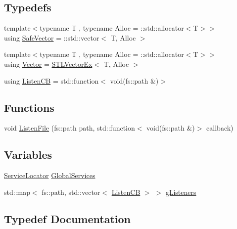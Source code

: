 \subsection*{Typedefs}
\begin{DoxyCompactItemize}
\item 
{\footnotesize template$<$typename T , typename Alloc  = \+::std\+::allocator$<$\+T$>$$>$ }\\using \mbox{\hyperlink{namespacenabla_a2f96ae838f528e078f7bcdb42fbbe706}{Safe\+Vector}} = \+::std\+::vector$<$ T, Alloc $>$
\item 
{\footnotesize template$<$typename T , typename Alloc  = \+::std\+::allocator$<$\+T$>$$>$ }\\using \mbox{\hyperlink{namespacenabla_a34f7ca8c9af290f9af3ed299236ff959}{Vector}} = \mbox{\hyperlink{classnabla_1_1_s_t_l_vector_ex}{S\+T\+L\+Vector\+Ex}}$<$ T, Alloc $>$
\item 
using \mbox{\hyperlink{namespacenabla_abd03676c495fab67cc7ac9b90e31c152}{Listen\+CB}} = std\+::function$<$ void(fs\+::path \&)$>$
\end{DoxyCompactItemize}
\subsection*{Functions}
\begin{DoxyCompactItemize}
\item 
void \mbox{\hyperlink{namespacenabla_a76f6ec6bf96a20352e3fe6d075bfe137}{Listen\+File}} (fs\+::path path, std\+::function$<$ void(fs\+::path \&)$>$ callback)
\end{DoxyCompactItemize}
\subsection*{Variables}
\begin{DoxyCompactItemize}
\item 
\mbox{\hyperlink{classnabla_1_1_service_locator}{Service\+Locator}} \mbox{\hyperlink{namespacenabla_ac9094e134a73575efe47915c9f6b10fc}{Global\+Services}}
\item 
std\+::map$<$ fs\+::path, std\+::vector$<$ \mbox{\hyperlink{namespacenabla_abd03676c495fab67cc7ac9b90e31c152}{Listen\+CB}} $>$ $>$ \mbox{\hyperlink{namespacenabla_abc8c0b4e42511a328da34e4f82ef92da}{g\+Listeners}}
\end{DoxyCompactItemize}


\subsection{Typedef Documentation}
\mbox{\label{namespacenabla_abd03676c495fab67cc7ac9b90e31c152}} 
